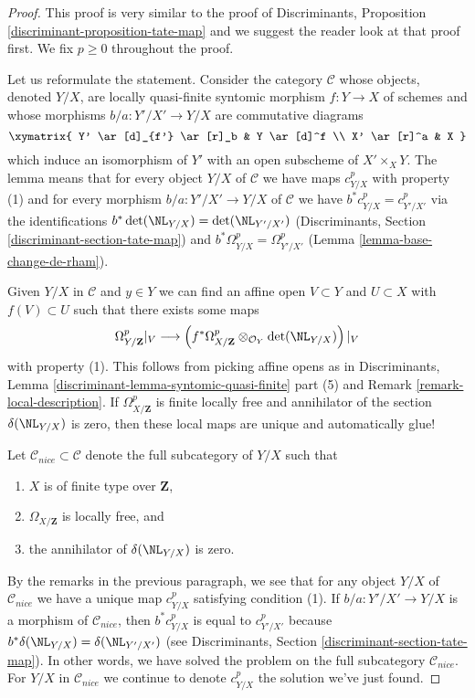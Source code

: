 \begin{proof}
This proof is very similar to the proof of
Discriminants, Proposition \ref{discriminant-proposition-tate-map}
and we suggest the reader look at that proof first.
We fix $p \geq 0$ throughout the proof.

\medskip\noindent
Let us reformulate the statement. Consider the category
$\mathcal{C}$ whose objects, denoted $Y/X$, are locally quasi-finite syntomic
morphism $f : Y \to X$ of schemes and whose morphisms
$b/a : Y'/X' \to Y/X$ are commutative diagrams
$$
\xymatrix{
Y' \ar[d]_{f'} \ar[r]_b & Y \ar[d]^f \\
X' \ar[r]^a & X
}
$$
which induce an isomorphism of $Y'$ with an open subscheme of
$X' \times_X Y$. The lemma means that for every object
$Y/X$ of $\mathcal{C}$ we have maps $c^p_{Y/X}$ with property (1)
and for every morphism $b/a : Y'/X' \to Y/X$ of $\mathcal{C}$ we have
$b^*c^p_{Y/X} = c^p_{Y'/X'}$ via the identifications
$b^*\det(\NL_{Y/X}) = \det(\NL_{Y'/X'})$
(Discriminants, Section \ref{discriminant-section-tate-map})
and $b^*\Omega^p_{Y/X} = \Omega^p_{Y'/X'}$
(Lemma \ref{lemma-base-change-de-rham}).

\medskip\noindent
Given $Y/X$ in $\mathcal{C}$ and $y \in Y$ we can find
an affine open $V \subset Y$ and $U \subset X$ with $f(V) \subset U$
such that there exists some maps
$$
\Omega^p_{Y/\mathbf{Z}}|_V
\longrightarrow
\left(
f^*\Omega^p_{X/\mathbf{Z}} \otimes_{\mathcal{O}_Y} \det(\NL_{Y/X})
\right)|_V
$$
with property (1). This follows
from picking affine opens as in
Discriminants, Lemma \ref{discriminant-lemma-syntomic-quasi-finite} part (5)
and Remark \ref{remark-local-description}.
If $\Omega^p_{X/\mathbf{Z}}$ is finite locally free and
annihilator of the section $\delta(\NL_{Y/X})$ is zero, then
these local maps are unique and automatically glue!

\medskip\noindent
Let $\mathcal{C}_{nice} \subset \mathcal{C}$ denote the full subcategory
of $Y/X$ such that
\begin{enumerate}
\item $X$ is of finite type over $\mathbf{Z}$,
\item $\Omega_{X/\mathbf{Z}}$ is locally free, and
\item  the annihilator of $\delta(\NL_{Y/X})$ is zero.
\end{enumerate}
By the remarks in the previous paragraph, we see that for any
object $Y/X$ of $\mathcal{C}_{nice}$ we have a unique map
$c^p_{Y/X}$ satisfying condition (1). If $b/a : Y'/X' \to Y/X$
is a morphism of $\mathcal{C}_{nice}$, then
$b^*c^p_{Y/X}$ is equal to $c^p_{Y'/X'}$ because
$b^*\delta(\NL_{Y/X}) = \delta(\NL_{Y'/X'})$ (see
Discriminants, Section \ref{discriminant-section-tate-map}).
In other words, we have solved the problem
on the full subcategory $\mathcal{C}_{nice}$. For $Y/X$ in $\mathcal{C}_{nice}$
we continue to denote $c^p_{Y/X}$ the solution we've just found.


\end{proof}
